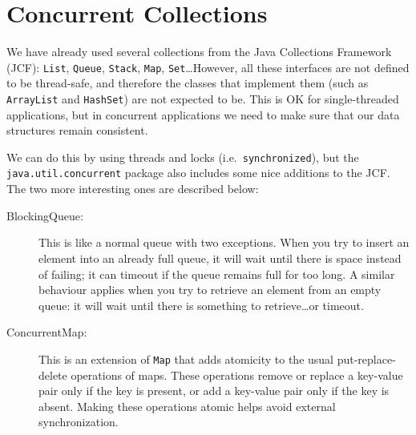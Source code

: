 \section{Concurrent Collections}
\label{sec:conc-coll}

We have already used several collections from the Java Collections
Framework (JCF): \verb+List+, \verb+Queue+, \verb+Stack+, \verb+Map+,
\verb+Set+\ldots However, all these interfaces are not defined to be
thread-safe, and therefore the classes that implement them (such as
\verb+ArrayList+ and \verb+HashSet+) are not expected to be. This is OK
for single-threaded applications, but in concurrent applications we
need to make sure that our data structures remain consistent. 

We can do this by using threads and locks (i.e.~\verb+synchronized+),
but the \verb+java.util.concurrent+ package also includes some nice
additions to the JCF. The two more interesting ones are described
below: 

\begin{description}
\item[BlockingQueue: ] This is like a normal queue with two
  exceptions. When you try to insert an element into an already full
  queue, it will wait until there is space instead of failing; it can
  timeout if the queue remains full for too long. A similar behaviour
  applies when you try to retrieve an element from an empty queue: it
  will wait until there is something to retrieve\ldots or timeout.
\item[ConcurrentMap: ] This is an extension of \verb+Map+ that adds
  atomicity to the usual put-replace-delete operations of maps. These
  operations remove or replace a key-value pair only if the key is
  present, or add a key-value pair only if the key is absent. Making
  these operations atomic helps avoid external synchronization.
\end{description}



